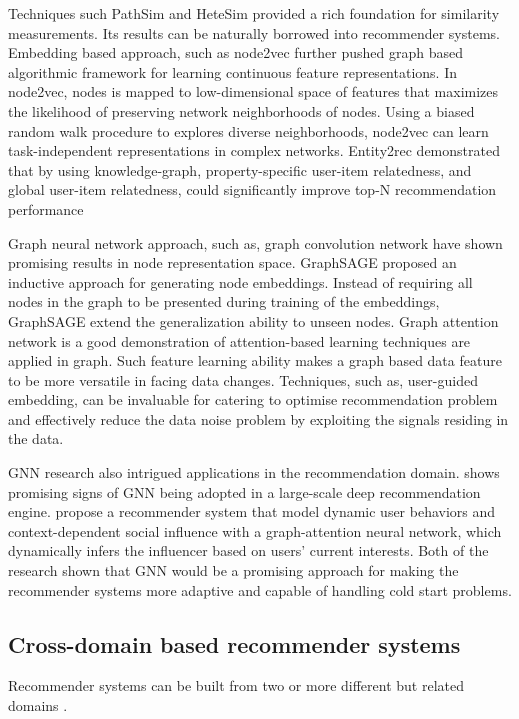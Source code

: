Techniques such PathSim \citep{Sun2011PathSim} and HeteSim \citep{Shi2013HeteSim} provided a rich foundation for similarity measurements. Its results can be naturally borrowed into recommender systems. 
Embedding based approach, such as node2vec \citep{grover2016node2vec} further pushed graph based algorithmic framework for learning continuous feature representations. In node2vec, nodes is mapped to low-dimensional space of features that maximizes the likelihood of preserving network neighborhoods of nodes. Using a biased random walk procedure to explores diverse neighborhoods, node2vec can learn task-independent representations in complex networks. 
Entity2rec \citep{palumbo2017entity2rec} demonstrated that by using knowledge-graph, property-specific user-item relatedness, and global user-item relatedness, could significantly improve top-N recommendation performance

Graph neural network approach, such as, graph convolution network \citep{kipf2016semi} have shown promising results in node representation space. 
GraphSAGE \citep{hamilton2017inductive} proposed an inductive approach for generating node embeddings. Instead of requiring all nodes in the graph to be presented during training of the embeddings, GraphSAGE extend the generalization ability to unseen nodes. 
Graph attention network \citep{lee2018graph} is a good demonstration of attention-based learning techniques are applied in graph. Such feature learning ability makes a graph based data feature to be more versatile in facing data changes. 
Techniques, such as, user-guided embedding, can be invaluable for catering to optimise recommendation problem and effectively reduce the data noise problem by exploiting the signals residing in the data.

GNN research also intrigued applications in the recommendation domain. \citet{ying2018graph} shows promising signs of GNN being adopted in a large-scale deep recommendation engine. \citet{song2019session} propose a recommender system that model dynamic user behaviors and context-dependent social influence with a graph-attention neural network, which dynamically infers the influencer based on users’ current interests. Both of the research shown that GNN would be a promising approach for making the recommender systems more adaptive and capable of handling cold start problems.

\subsection{Cross-domain based recommender systems}
Recommender systems can be built from two or more different but related domains \citep{fernandez2012cross}.

